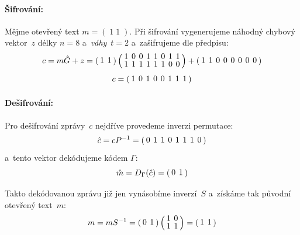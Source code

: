 \documentclass[thesis=M,czech,hidelinks]{FITthesis}[2012/06/26]
\newcommand{\0}{{\textcolor[gray]{0.75}{0}}}
\begin{document}
\paragraph{Šifrování:} Mějme otevřený text $m=\left(\;1\;1\;\right)$. Při
šifrování vygenerujeme náhodný chybový vektor~$z$ délky $n=8$
a~\emph{váhy}~$t=2$ a~zašifrujeme dle předpisu:
$$
\arraycolsep=2pt
\def\arraystretch{0.8}
    c = m \hat{G} + z
      = \left(
        \begin{array}{*{2}{c}}
            1 & 1 \\
        \end{array}
    \right) \left(
        \begin{array}{*{8}{c}}
            1 & 0 & 0 & 1 & 1 & 0 & 1 & 1 \\
            1 & 1 & 1 & 1 & 1 & 1 & 0 & 0 \\
        \end{array}
    \right) + \left(
        \begin{array}{*{8}{c}}
            1 & 1 & 0 & 0 & 0 & 0 & 0 & 0 \\
        \end{array}
    \right)
$$
$$
\arraycolsep=2pt
\def\arraystretch{0.8}
    c = \left(
        \begin{array}{*{8}{c}}
            1 & 0 & 1 & 0 & 0 & 1 & 1 & 1 \\
        \end{array}
    \right)
$$


\paragraph{Dešifrování:} Pro dešifrování zprávy~$c$ nejdříve provedeme inverzi
permutace:
$$
\arraycolsep=2pt
\def\arraystretch{0.8}
    \hat{c} = c P^{-1} = \left(
        \begin{array}{*{8}{c}}
            0 & 1 & 1 & 0 & 1 & 1 & 1 & 0 \\
        \end{array}
    \right)
$$
a~tento vektor dekódujeme kódem $\Gamma$:
$$
\arraycolsep=2pt
\def\arraystretch{0.8}
    \hat{m} = D_{\Gamma}(\hat{c}) = \left(
        \begin{array}{*{2}{c}}
            0 & 1 \\
        \end{array}
    \right)
$$

Takto dekódovanou zprávu již jen vynásobíme inverzí~$S$ a~získáme tak původní
otevřený text~$m$:
$$
\arraycolsep=2pt
\def\arraystretch{0.8}
    m = m S^{-1} = \left(
        \begin{array}{*{2}{c}}
            0 & 1 \\
        \end{array}
    \right) \left(
        \begin{array}{*{2}{c}}
            1 & 0 \\
            1 & 1 \\
        \end{array}
    \right) = \left(
        \begin{array}{*{2}{c}}
            1 & 1 \\
        \end{array}
    \right)
$$
\end{document}
